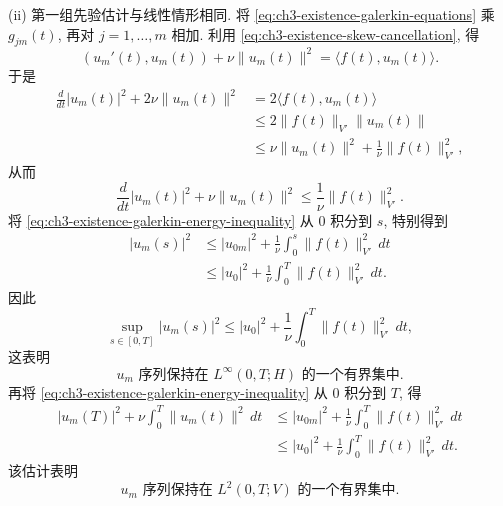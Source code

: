 \hypertarget{chapter-03-page-208}{}
(ii) 第一组先验估计与线性情形相同. 将 \eqref{eq:ch3-existence-galerkin-equations} 乘 $g_{jm}(t)$, 再对 $j=1,\ldots,m$ 相加. 利用 \eqref{eq:ch3-existence-skew-cancellation}, 得
\begin{equation}
(u_m'(t),u_m(t))+\nu\lVert u_m(t)\rVert^2
=\langle f(t),u_m(t)\rangle.
\label{eq:ch3-existence-galerkin-energy-identity}
\end{equation}
于是
\[
\begin{aligned}
\frac d{dt}|u_m(t)|^2+2\nu\lVert u_m(t)\rVert^2
&=2\langle f(t),u_m(t)\rangle\\
&\leq2\lVert f(t)\rVert_{V'}\lVert u_m(t)\rVert\\
&\leq\nu\lVert u_m(t)\rVert^2+\frac1\nu\lVert f(t)\rVert_{V'}^2,
\end{aligned}
\]
从而
\begin{equation}
\frac d{dt}|u_m(t)|^2+\nu\lVert u_m(t)\rVert^2
\leq\frac1\nu\lVert f(t)\rVert_{V'}^2.
\label{eq:ch3-existence-galerkin-energy-inequality}
\end{equation}
将 \eqref{eq:ch3-existence-galerkin-energy-inequality} 从 $0$ 积分到 $s$, 特别得到
\[
\begin{aligned}
|u_m(s)|^2
&\leq|u_{0m}|^2+\frac1\nu\int_0^s\lVert f(t)\rVert_{V'}^2\,dt\\
&\leq|u_0|^2+\frac1\nu\int_0^T\lVert f(t)\rVert_{V'}^2\,dt.
\end{aligned}
\]
因此
\begin{equation}
\sup_{s\in[0,T]}|u_m(s)|^2
\leq|u_0|^2+\frac1\nu\int_0^T\lVert f(t)\rVert_{V'}^2\,dt,
\label{eq:ch3-existence-galerkin-linfty-bound}
\end{equation}
这表明
\begin{equation}
u_m\text{ 序列保持在 }L^\infty(0,T;H)\text{ 的一个有界集中}.
\label{eq:ch3-existence-galerkin-linfty-boundedness}
\end{equation}
再将 \eqref{eq:ch3-existence-galerkin-energy-inequality} 从 $0$ 积分到 $T$, 得
\[
\begin{aligned}
|u_m(T)|^2+\nu\int_0^T\lVert u_m(t)\rVert^2\,dt
&\leq|u_{0m}|^2+\frac1\nu\int_0^T\lVert f(t)\rVert_{V'}^2\,dt\\
&\leq|u_0|^2+\frac1\nu\int_0^T\lVert f(t)\rVert_{V'}^2\,dt.
\end{aligned}
\]
该估计表明
\begin{equation}
u_m\text{ 序列保持在 }L^2(0,T;V)\text{ 的一个有界集中}.
\label{eq:ch3-existence-galerkin-l2-boundedness}
\end{equation}

